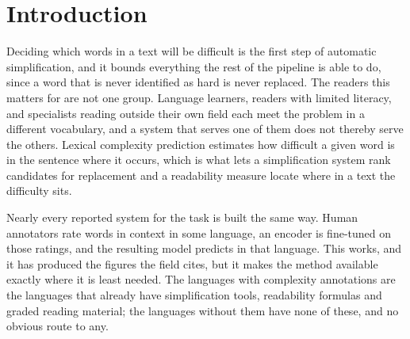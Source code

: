 %
%
%
\section{Introduction}
\label{sec:intro}

Deciding which words in a text will be difficult is the first step of
automatic simplification, and it bounds everything the rest of the
pipeline is able to do, since a word that is never identified as hard is
never replaced. The readers this matters for are not one group.
Language learners, readers with limited literacy, and specialists
reading outside their own field each meet the problem in a different
vocabulary, and a system that serves one of them does not thereby serve
the others. Lexical complexity prediction estimates how difficult a
given word is in the sentence where it occurs, which is what lets a
simplification system rank candidates for replacement and a readability
measure locate where in a text the difficulty sits.

Nearly every reported system for the task is built the same way. Human
annotators rate words in context in some language, an encoder is
fine-tuned on those ratings, and the resulting model predicts in that
language. This works, and it has produced the figures the field cites,
but it makes the method available exactly where it is least needed. The
languages with complexity annotations are the languages that already
have simplification tools, readability formulas and graded reading
material; the languages without them have none of these, and no obvious
route to any.

